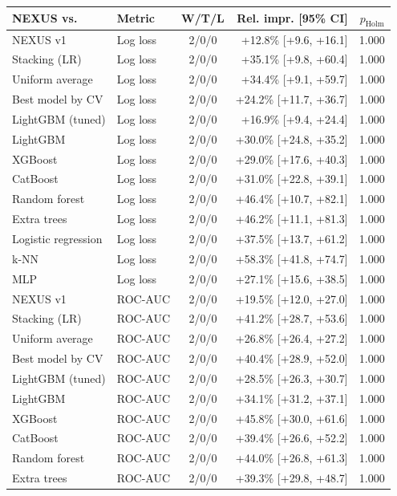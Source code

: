 \begin{tabular}{llcrr}
\toprule
NEXUS vs. & Metric & W/T/L & Rel. impr. [95\% CI] & $p_\text{Holm}$\\
\midrule
NEXUS v1 & Log loss & 2/0/0 & +12.8\% [+9.6, +16.1] & 1.000\\
Stacking (LR) & Log loss & 2/0/0 & +35.1\% [+9.8, +60.4] & 1.000\\
Uniform average & Log loss & 2/0/0 & +34.4\% [+9.1, +59.7] & 1.000\\
Best model by CV & Log loss & 2/0/0 & +24.2\% [+11.7, +36.7] & 1.000\\
LightGBM (tuned) & Log loss & 2/0/0 & +16.9\% [+9.4, +24.4] & 1.000\\
LightGBM & Log loss & 2/0/0 & +30.0\% [+24.8, +35.2] & 1.000\\
XGBoost & Log loss & 2/0/0 & +29.0\% [+17.6, +40.3] & 1.000\\
CatBoost & Log loss & 2/0/0 & +31.0\% [+22.8, +39.1] & 1.000\\
Random forest & Log loss & 2/0/0 & +46.4\% [+10.7, +82.1] & 1.000\\
Extra trees & Log loss & 2/0/0 & +46.2\% [+11.1, +81.3] & 1.000\\
Logistic regression & Log loss & 2/0/0 & +37.5\% [+13.7, +61.2] & 1.000\\
k-NN & Log loss & 2/0/0 & +58.3\% [+41.8, +74.7] & 1.000\\
MLP & Log loss & 2/0/0 & +27.1\% [+15.6, +38.5] & 1.000\\
NEXUS v1 & ROC-AUC & 2/0/0 & +19.5\% [+12.0, +27.0] & 1.000\\
Stacking (LR) & ROC-AUC & 2/0/0 & +41.2\% [+28.7, +53.6] & 1.000\\
Uniform average & ROC-AUC & 2/0/0 & +26.8\% [+26.4, +27.2] & 1.000\\
Best model by CV & ROC-AUC & 2/0/0 & +40.4\% [+28.9, +52.0] & 1.000\\
LightGBM (tuned) & ROC-AUC & 2/0/0 & +28.5\% [+26.3, +30.7] & 1.000\\
LightGBM & ROC-AUC & 2/0/0 & +34.1\% [+31.2, +37.1] & 1.000\\
XGBoost & ROC-AUC & 2/0/0 & +45.8\% [+30.0, +61.6] & 1.000\\
CatBoost & ROC-AUC & 2/0/0 & +39.4\% [+26.6, +52.2] & 1.000\\
Random forest & ROC-AUC & 2/0/0 & +44.0\% [+26.8, +61.3] & 1.000\\
Extra trees & ROC-AUC & 2/0/0 & +39.3\% [+29.8, +48.7] & 1.000\\

\end{tabular}
